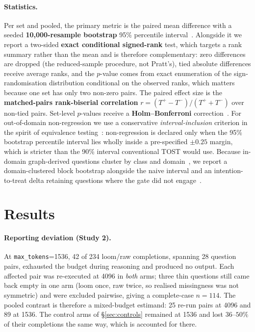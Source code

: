 \documentclass[10pt,twocolumn]{article}
\begin{document}
\paragraph{Statistics.} Per set and pooled, the primary metric is the paired mean difference with a seeded \textbf{10{,}000-resample bootstrap} 95\% percentile interval~\cite{efron1979bootstrap,koehn2004significance}. Alongside it we report a two-sided \textbf{exact conditional signed-rank} test, which targets a rank summary rather than the mean and is therefore complementary: zero differences are dropped (the reduced-sample procedure, not Pratt's), tied absolute differences receive average ranks, and the $p$-value comes from exact enumeration of the sign-randomisation distribution conditional on the observed ranks, which matters because one set has only two non-zero pairs. The paired effect size is the \textbf{matched-pairs rank-biserial correlation} $r=(T^{+}-T^{-})/(T^{+}+T^{-})$ over non-tied pairs. Set-level $p$-values receive a \textbf{Holm--Bonferroni} correction~\cite{dror2018hitchhiker}. For out-of-domain non-regression we use a conservative \emph{interval-inclusion} criterion in the spirit of equivalence testing~\cite{lakens2017equivalence}: non-regression is declared only when the 95\% bootstrap percentile interval lies wholly inside a pre-specified $\pm0.25$ margin, which is stricter than the 90\% interval conventional TOST would use. Because in-domain graph-derived questions cluster by class and domain~\cite{dror2018hitchhiker}, we report a domain-clustered block bootstrap alongside the naive interval and an intention-to-treat delta retaining questions where the gate did not engage~\cite{hollis1999itt}.

\section{Results}\label{sec:results}
\paragraph{Reporting deviation (Study 2).} At \texttt{max\_tokens}=1536, 42 of 234 loom/raw completions, spanning 28 question pairs, exhausted the budget during reasoning and produced no output. Each affected pair was re-executed at 4096 in \emph{both} arms; three thin questions still came back empty in one arm (loom once, raw twice, so realised missingness was not symmetric) and were excluded pairwise, giving a complete-case $n=114$. The pooled contrast is therefore a mixed-budget estimand: 25 re-run pairs at 4096 and 89 at 1536. The control arms of \S\ref{sec:controls} remained at 1536 and lost $36$--$50\%$ of their completions the same way, which is accounted for there.
\end{document}
